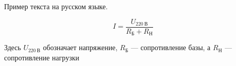 \documentclass{article}
\begin{document}
Пример текста на русском языке.


\begin{equation}
  \label{ohm_law}
  I = \frac{U_{220~\text{В}}}{R_\text{Б} + R_\text{Н}}
\end{equation}

Здесь $U_{220~\text{В}}$ обозначает напряжение, $R_\text{Б}$ — сопротивление базы, а $R_\text{Н}$ — сопротивление нагрузки
\end{document}
